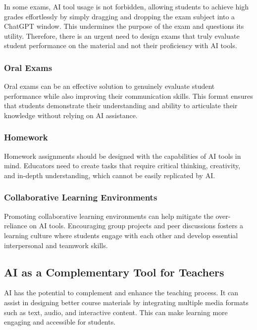 \documentclass{article}
\begin{document}
In some exams, AI tool usage is not forbidden, allowing students to achieve high grades effortlessly by simply dragging and dropping the exam subject into a ChatGPT window. This undermines the purpose of the exam and questions its utility. Therefore, there is an urgent need to design exams that truly evaluate student performance on the material and not their proficiency with AI tools.


\subsubsection{Oral Exams}

Oral exams can be an effective solution to genuinely evaluate student performance while also improving their communication skills. This format ensures that students demonstrate their understanding and ability to articulate their knowledge without relying on AI assistance.

\subsubsection{Homework}

Homework assignments should be designed with the capabilities of AI tools in mind. Educators need to create tasks that require critical thinking, creativity, and in-depth understanding, which cannot be easily replicated by AI.

\subsubsection{Collaborative Learning Environments}

Promoting collaborative learning environments can help mitigate the over-reliance on AI tools. Encouraging group projects and peer discussions fosters a learning culture where students engage with each other and develop essential interpersonal and teamwork skills.

\subsection{AI as a Complementary Tool for Teachers}

AI has the potential to complement and enhance the teaching process. It can assist in designing better course materials by integrating multiple media formats such as text, audio, and interactive content. This can make learning more engaging and accessible for students.
\end{document}
